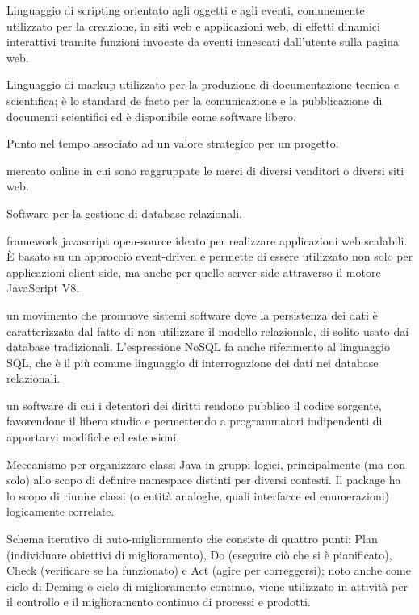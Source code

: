\item[JavaScript] Linguaggio di scripting orientato agli oggetti e agli eventi, comunemente utilizzato per la creazione, in siti web e applicazioni web, di effetti dinamici interattivi tramite funzioni invocate da eventi innescati dall’utente sulla pagina web.
\item[Latex] Linguaggio di markup utilizzato per la produzione di documentazione tecnica e scientifica; è lo standard de facto per la comunicazione e la pubblicazione di documenti scientifici ed è disponibile come software libero.
\item[milestone] Punto nel tempo associato ad un valore strategico per un progetto.
\item[Marketplace] mercato online in cui sono raggruppate le merci di diversi venditori o diversi siti web.
\item[MySQL] Software per la gestione di database relazionali.
\item[Node.js] framework javascript open-source ideato per realizzare applicazioni web scalabili. È basato su un approccio event-driven e permette di essere utilizzato non solo per applicazioni client-side, ma anche per quelle server-side attraverso il motore JavaScript V8.
\item[nosql] un movimento che promuove sistemi software dove la persistenza dei dati è caratterizzata dal fatto di non utilizzare il modello relazionale, di solito usato dai database tradizionali. L'espressione NoSQL fa anche riferimento al linguaggio SQL, che è il più comune linguaggio di interrogazione dei dati nei database relazionali.
\item[Open Source] un software di cui i detentori dei diritti rendono pubblico il codice sorgente, favorendone il libero studio e permettendo a programmatori indipendenti di apportarvi modifiche ed estensioni. 
\item[package] Meccanismo per organizzare classi Java in gruppi logici, principalmente (ma non solo) allo scopo di definire namespace distinti per diversi contesti. Il package ha lo scopo di riunire classi (o entità analoghe, quali interfacce ed enumerazioni) logicamente correlate.
\item[PDCA, schema] Schema iterativo di auto-miglioramento che consiste di quattro punti: Plan (individuare obiettivi di miglioramento), Do (eseguire ciò che si è pianificato), Check (verificare se ha funzionato) e Act (agire per correggersi); noto anche come ciclo di Deming o ciclo di miglioramento continuo, viene utilizzato in attività per il controllo e il miglioramento continuo di processi e prodotti.
